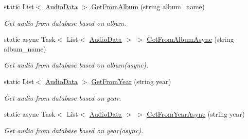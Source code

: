 \begin{DoxyCompactItemize}
static List$<$ \mbox{\hyperlink{classOSML_1_1Media_1_1AudioData}{Audio\+Data}} $>$ \mbox{\hyperlink{classOSML_1_1Data_1_1Music_1_1OSMLAudioData_a61354400c9e04ef939b1c8731472efe8}{Get\+From\+Album}} (string album\+\_\+name)
\begin{DoxyCompactList}\small\item\em Get audio from database based on album. \end{DoxyCompactList}\item 
static async Task$<$ List$<$ \mbox{\hyperlink{classOSML_1_1Media_1_1AudioData}{Audio\+Data}} $>$ $>$ \mbox{\hyperlink{classOSML_1_1Data_1_1Music_1_1OSMLAudioData_a4b7fcb38d92a4bc30a3175b706ed12f6}{Get\+From\+Album\+Async}} (string album\+\_\+name)
\begin{DoxyCompactList}\small\item\em Get audio from database based on album(async). \end{DoxyCompactList}\item 
static List$<$ \mbox{\hyperlink{classOSML_1_1Media_1_1AudioData}{Audio\+Data}} $>$ \mbox{\hyperlink{classOSML_1_1Data_1_1Music_1_1OSMLAudioData_aa160a8b1b2b06fdd9f83ec3d5dc03462}{Get\+From\+Year}} (string year)
\begin{DoxyCompactList}\small\item\em Get audio from database based on year. \end{DoxyCompactList}\item 
static async Task$<$ List$<$ \mbox{\hyperlink{classOSML_1_1Media_1_1AudioData}{Audio\+Data}} $>$ $>$ \mbox{\hyperlink{classOSML_1_1Data_1_1Music_1_1OSMLAudioData_a8bd87ed0b02589733ded4479175eac5e}{Get\+From\+Year\+Async}} (string year)
\begin{DoxyCompactList}\small\item\em Get audio from database based on year(async). \end{DoxyCompactList}\end{DoxyCompactItemize}
